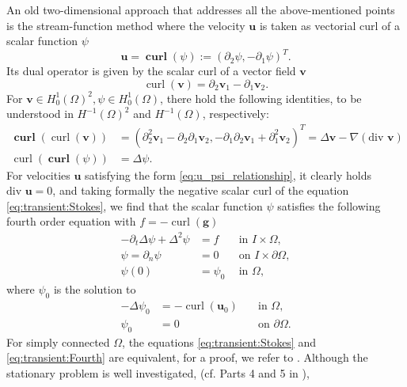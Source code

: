 \documentclass{m2an}
\newcommand{\1}{\mathds{1}}
\renewcommand{\u}{\mathbf{u}}
\newcommand{\vv}{\mathbf{v}}
\newcommand{\g}{\mathbf{g}}
\renewcommand{\div}{\text{div }}
\newcommand{\Om}{\Omega}
\newcommand{\curl}{\operatorname{curl}}
\newcommand{\Curl}{\operatorname{\mathbf{curl}}}
\theoremstyle{definition}
\begin{document}
An old two-dimensional approach that addresses all the above-mentioned points  is the stream-function method where the velocity $\u$ is taken as vectorial curl of a scalar function $\psi$
\begin{equation}\label{eq:u_psi_relationship}
\u = \Curl(\psi):=(\partial_2 \psi, -\partial_1 \psi)^T.
\end{equation}
Its dual operator is given by the scalar curl of a vector field $\vv$
$$
  \curl(\vv) = \partial_2 \vv_1 - \partial_1 \vv_2.
$$
For $\vv \in H^1_0(\Om)^2, \psi \in H^1_0(\Om)$, there hold the following identities, to be understood in 
$H^{-1}(\Om)^2$ and $H^{-1}(\Om)$, respectively:
\begin{align}
  \Curl(\curl(\vv)) &= (\partial_2^2 \vv_1 - \partial_2 \partial_1 \vv_2,-\partial_1 \partial_2 \vv_1+\partial_1^2 \vv_2)^T = \Delta \vv - \nabla (\div \vv)
  \label{eq:Curlcurl}\\
  \curl(\Curl(\psi)) &= \Delta \psi. \label{eq:curlCurl}
\end{align}
For velocities $\u$ satisfying the form \eqref{eq:u_psi_relationship}, it clearly holds $\div\u=0$,
and taking formally the negative scalar curl of the equation
\eqref{eq:transient:Stokes}, we find that the scalar function $\psi$ satisfies the following fourth order  equation with $f = -\curl(\g)$
\begin{equation}\label{eq:transient:Fourth}
    \begin{aligned}
	-\partial_t\Delta\psi+\Delta^2 \psi &= f \quad &\text{in }I\times\Omega, \\
	\psi=\partial_n\psi &=  0 \quad  &\text{on } I\times\partial \Omega, \\
	\psi(0) &= \psi_0 &\text{in } \Omega,
    \end{aligned}
\end{equation}
where $\psi_0$ is the solution to 
\begin{equation}\label{eq:initial_psi0}
    \begin{aligned}
	-\Delta \psi_0 &= -\curl(\u_0) \quad &\text{in }\Omega, \\
	\psi_0 &=  0 \quad  &\text{on } \partial \Omega.
    \end{aligned}
\end{equation}
For simply connected $\Omega$, the equations  \eqref{eq:transient:Stokes} and \eqref{eq:transient:Fourth} 
are equivalent, for a proof, we refer to \cite{GuermondJL_QuartapelleL_1994}.
 Although the stationary problem is well investigated, (cf. Parts 4 and 5 in \cite{GunzburgerM_2012}),
\end{document}
